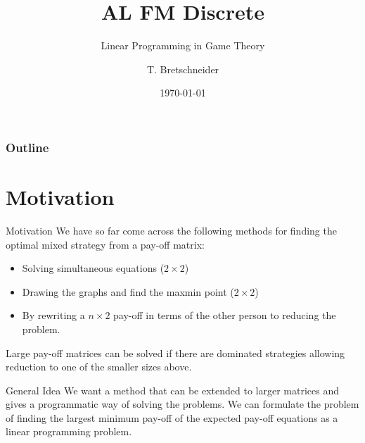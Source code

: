 \documentclass[8pt]{beamer}
\title[Discrete]{AL FM Discrete}
\subtitle{Linear Programming in Game Theory}
\author[]{T. Bretschneider}
\date[\today]{\today}
\begin{document}
\frame{\titlepage}

\begin{frame}
\frametitle{Outline}
\tableofcontents

\end{frame}


\section{Motivation}

\begin{frame}{Motivation}
	We have so far come across the following methods for finding the optimal mixed strategy from a pay-off matrix:
\begin{itemize}
	\item Solving simultaneous equations ($2 \times 2$)
	\item Drawing the graphs and find the maxmin point  ($2 \times 2$)
\item By rewriting a $n \times 2$ pay-off in terms of the other person to reducing the problem.
\end{itemize}
Large pay-off matrices can be solved if there are dominated strategies allowing reduction to one of the smaller sizes above.
\begin{alertblock}{General Idea}
We want a method that can be extended to larger matrices and gives a programmatic way of solving the problems. We can formulate the problem of finding the largest minimum pay-off of the expected pay-off equations as a linear programming problem. 
\end{alertblock}

\end{frame}
\end{document}
